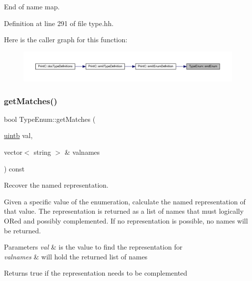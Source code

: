 End of name map. 



Definition at line 291 of file type.\+hh.

Here is the caller graph for this function\+:
\nopagebreak
\begin{figure}[H]
\begin{center}
\leavevmode
\includegraphics[width=350pt]{class_type_enum_a60c142f090f378f3d79627d992fe5483_icgraph}
\end{center}
\end{figure}
\mbox{\label{class_type_enum_a9ea9c9d8c439990a5be5828ec2d9b9fd}} 
\subsubsection{\texorpdfstring{getMatches()}{getMatches()}}
{\footnotesize\ttfamily bool Type\+Enum\+::get\+Matches (\begin{DoxyParamCaption}\item[{\mbox{\hyperlink{types_8h_a2db313c5d32a12b01d26ac9b3bca178f}{uintb}}}]{val,  }\item[{vector$<$ string $>$ \&}]{valnames }\end{DoxyParamCaption}) const}



Recover the named representation. 

Given a specific value of the enumeration, calculate the named representation of that value. The representation is returned as a list of names that must logically O\+Red and possibly complemented. If no representation is possible, no names will be returned. 
\begin{DoxyParams}{Parameters}
{\em val} & is the value to find the representation for \\
\hline
{\em valnames} & will hold the returned list of names \\
\hline
\end{DoxyParams}
\begin{DoxyReturn}{Returns}
true if the representation needs to be complemented 
\end{DoxyReturn}


